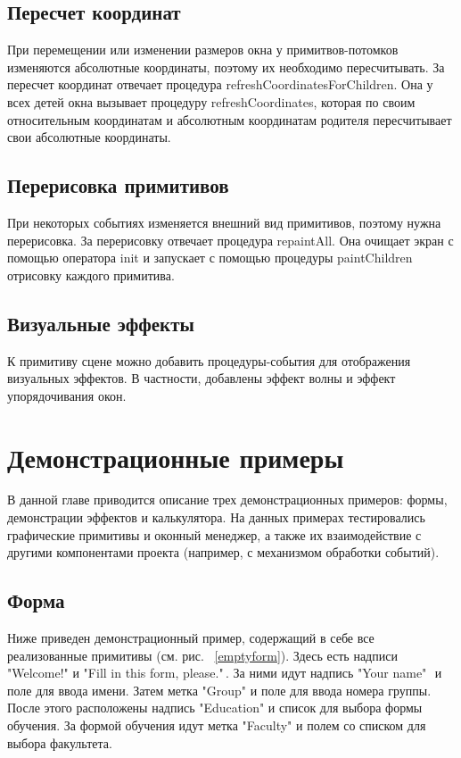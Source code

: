 \documentclass[14pt]{extarticle}
\begin{document}
	\subsection{Пересчет координат}
При перемещении или изменении размеров окна у примитвов-потомков изменяются абсолютные координаты, поэтому их необходимо пересчитывать. За пересчет координат отвечает процедура refreshCoordinatesForChildren. Она у всех детей окна вызывает процедуру refreshCoordinates, которая по своим относительным координатам и абсолютным координатам родителя пересчитывает свои абсолютные координаты. 

\subsection{Перерисовка примитивов}
При некоторых событиях изменяется внешний вид примитивов, поэтому нужна перерисовка. За перерисовку отвечает процедура repaintAll. Она очищает экран с помощью оператора init и запускает с помощью процедуры paintChildren отрисовку каждого примитива. 
		
	\subsection{Визуальные эффекты}
	К примитиву сцене можно добавить процедуры-события для отображения визуальных эффектов. В частности,  добавлены эффект волны и эффект упорядочивания окон. 
	\pagebreak
	\section{Демонстрационные примеры}
	
	В данной главе приводится описание трех демонстрационных примеров: формы, демонстрации эффектов и калькулятора. На данных примерах тестировались графические примитивы и оконный менеджер, а также их взаимодействие с другими компонентами проекта (например, с механизмом обработки событий).	
	\subsection{Форма}
	
	Ниже приведен демонстрационный пример, содержащий в себе все  реализованные примитивы (см. рис. ~\ref{emptyform}).
	Здесь есть надписи "Welcome!"\,\,и "Fill in this form, please."\,.
	За ними идут надпись "Your name"\,\, и поле для ввода имени.
	Затем метка "Group"\,\,и поле для ввода номера группы. 
	После этого расположены надпись "Education"\,\,и список для выбора формы обучения.
	За формой обучения идут метка "Faculty"\,\,и полем со списком для выбора факультета.
	
\end{document}
